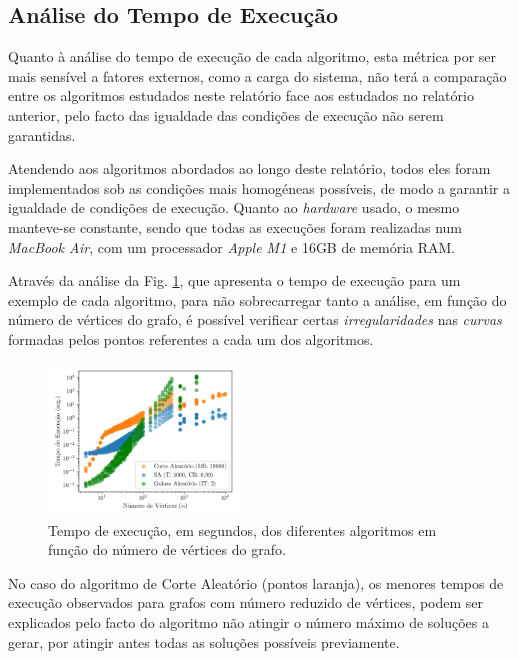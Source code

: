 \documentclass[mirror, portugues]{revdetua}
\begin{document}
\subsection{Análise do Tempo de Execução}

Quanto à análise do tempo de execução de cada algoritmo, esta métrica por ser mais sensível a fatores externos, como a carga do sistema, não terá a comparação entre os algoritmos estudados neste relatório face aos estudados no relatório anterior, pelo facto das igualdade das condições de execução não serem garantidas.

Atendendo aos algoritmos abordados ao longo deste relatório, todos eles foram implementados sob as condições mais homogéneas possíveis, de modo a garantir a igualdade de condições de execução. Quanto ao \textit{hardware} usado, o mesmo manteve-se constante, sendo que todas as execuções foram realizadas num \textit{MacBook Air}, com um processador \textit{Apple M1} e 16GB de memória RAM.

Através da análise da Fig. \ref{fig:time_all}, que apresenta o tempo de execução para um exemplo de cada algoritmo, para não sobrecarregar tanto a análise, em função do número de vértices do grafo, é possível verificar certas \textit{irregularidades} nas \textit{curvas} formadas pelos pontos referentes a cada um dos algoritmos.

\begin{figure}[H]
    \centering
    \includegraphics[width=0.45\textwidth]{../assets/time_all.png}
    \caption{Tempo de execução, em segundos, dos diferentes algoritmos em função do número de vértices do grafo.}
    \label{fig:time_all}
\end{figure}

No caso do algoritmo de Corte Aleatório (pontos laranja), os menores tempos de execução observados para grafos com número reduzido de vértices, podem ser explicados pelo facto do algoritmo não atingir o número máximo de soluções a gerar, por atingir antes todas as soluções possíveis previamente.
\end{document}
